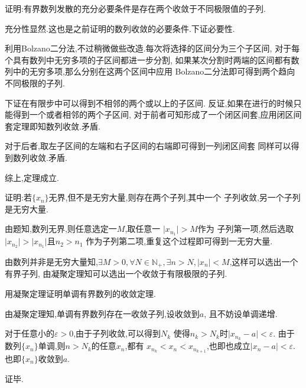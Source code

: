 \documentclass[cn]{elegantbook}
\begin{document}
        \begin{exercise}
            证明:有界数列发散的充分必要条件是存在两个收敛于不同极限值的子列.
        \end{exercise}
        \begin{solution}
            充分性显然.这也是之前证明的数列收敛的必要条件.下证必要性.

            利用Bolzano二分法,不过稍微做些改造.每次将选择的区间分为三个子区间,
            对于每个具有数列中无穷多项的子区间都进一步分割,
            如果某次分割时两端的区间都有数列中的无穷多项,那么分别在这两个区间中应用
            Bolzano二分法即可得到两个趋向不同极限的子列.

            下证在有限步中可以得到不相邻的两个或以上的子区间.
            反证,如果在进行的时候只能得到一个或者相邻的两个子区间,
            对于前者可知形成了一个闭区间套,应用闭区间套定理即知数列收敛.矛盾.

            对于后者,取左子区间的左端和右子区间的右端即可得到一列闭区间套
            同样可以得到数列收敛.矛盾.

            综上,定理成立.
        \end{solution}

        \begin{exercise}
            证明:若$\{x_n\}$无界,但不是无穷大量,则存在两个子列,其中一个
            子列收敛,另一个子列是无穷大量.
        \end{exercise}
        \begin{solution}
            由题知,数列无界,则任意选定一$M$,取任意一
            $\lvert x_{n_1}\rvert>M$作为
            子列第一项,然后选取
            $\lvert x_{n_2}\rvert>\lvert x_{n_1}\rvert$且$n_2>n_1$
            作为子列第二项,重复这个过程即可得到一无穷大量.

            由数列并非是无穷大量知,$\exists M>0,\forall N\in \mathbb{N}_+,
            \exists n>N,\lvert x_n\rvert<M$,这样可以选出一个有界子列,
            由凝聚定理知可以选出一个收敛于有限极限的子列.
        \end{solution}

        \begin{exercise}
            用凝聚定理证明单调有界数列的收敛定理.
        \end{exercise}
        \begin{solution}
            由凝聚定理知,单调有界数列存在一收敛子列,设收敛到$a$,
            且不妨设单调递增.

            对于任意小的$\varepsilon>0$,由于子列收敛,可以得到$N_k$
            使得$n_k>N_k$时$\lvert x_{n_k}-a\rvert<\varepsilon$.
            由于数列$\{x_n\}$单调,则$n>N_k$的任意$x_n$,都有
            $x_{n_k}<x_n<x_{n_{k+1}}$,也即也成立$\lvert x_n-a\rvert<\varepsilon$.
            也即$\{x_n\}$收敛到$a$.

            证毕.
        \end{solution}
\end{document}
